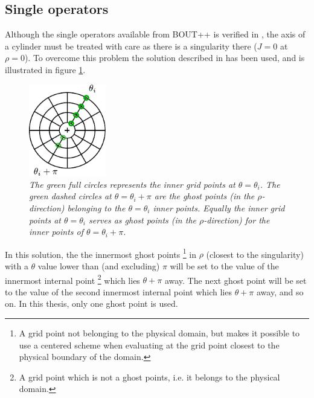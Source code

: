 \subsection{Single operators}
%
Although the single operators available from BOUT++ is verified in
\cite{Dudson2016}, the axis of a cylinder must be treated with care as there is
a singularity there ($J=0$ at $\rho=0$). To overcome this problem the
solution described in \cite{Naulin2008} has been used, and is illustrated in
figure \ref{fig:innerRho}.
%
\begin{figure}[htb]
    \centering
    \includegraphics[width=0.3\textwidth]{fig/innerGhost}
    \caption{\textit{
        The green full circles represents the inner grid points at
        $\theta=\theta_i$. The green dashed circles at $\theta=\theta_i + \pi$
        are the ghost points (in the $\rho$-direction) belonging to the
        $\theta=\theta_i$ inner points. Equally the inner grid points at
        $\theta=\theta_i$ serves as ghost points (in the $\rho$-direction) for
        the inner points of $\theta=\theta_i + \pi$.
    }}
    \label{fig:innerRho}
\end{figure}
%
In this solution, the
the innermost ghost points%
\footnote{A grid point not belonging to the physical domain, but makes it
    possible to use a centered scheme when evaluating at the grid point closest
    to the physical boundary of the domain.}
in $\rho$ (closest to the singularity) with a
$\theta$ value lower
than (and excluding) $\pi$ will be set to the value of the innermost
internal point%
\footnote{A grid point which is not a ghost points, i.e. it belongs to the
    physical domain.}%
%
which lies
$\theta + \pi$ away. The next ghost point will be set to the value of the
second innermost internal point which lies $\theta + \pi$ away, and so on. In
this thesis, only one ghost point is used.

